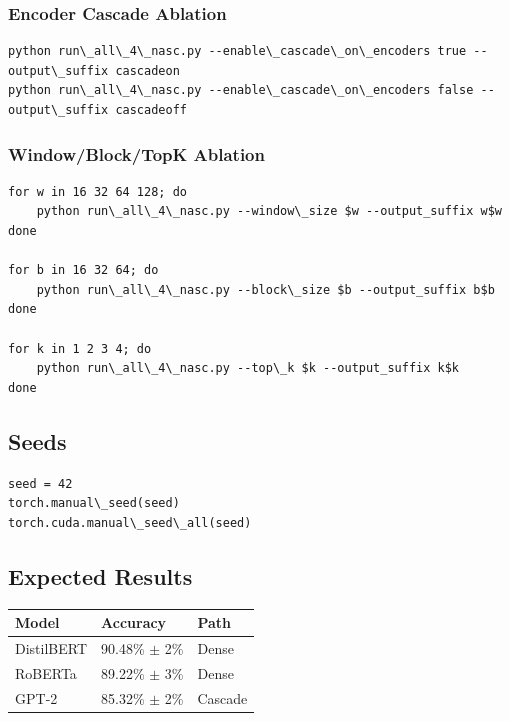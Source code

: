 \subsubsection{Encoder Cascade Ablation}

\begin{lstlisting}
python run\_all\_4\_nasc.py --enable\_cascade\_on\_encoders true --output\_suffix cascadeon
python run\_all\_4\_nasc.py --enable\_cascade\_on\_encoders false --output\_suffix cascadeoff
\end{lstlisting}

\subsubsection{Window/Block/TopK Ablation}

\begin{lstlisting}
for w in 16 32 64 128; do
    python run\_all\_4\_nasc.py --window\_size $w --output_suffix w$w
done

for b in 16 32 64; do
    python run\_all\_4\_nasc.py --block\_size $b --output_suffix b$b
done

for k in 1 2 3 4; do
    python run\_all\_4\_nasc.py --top\_k $k --output_suffix k$k
done
\end{lstlisting}

\subsection{Seeds}

\begin{lstlisting}
seed = 42
torch.manual\_seed(seed)
torch.cuda.manual\_seed\_all(seed)
\end{lstlisting}

\subsection{Expected Results}

\begin{table}[H]
\centering
\small
\begin{tabular}{lll}
\toprule
\textbf{Model} & \textbf{Accuracy} & \textbf{Path} \\
\midrule
DistilBERT & 90.48\% $\pm$ 2\% & Dense \\
RoBERTa & 89.22\% $\pm$ 3\% & Dense \\
GPT-2 & 85.32\% $\pm$ 2\% & Cascade \\
\bottomrule
\end{tabular}
\end{table}

